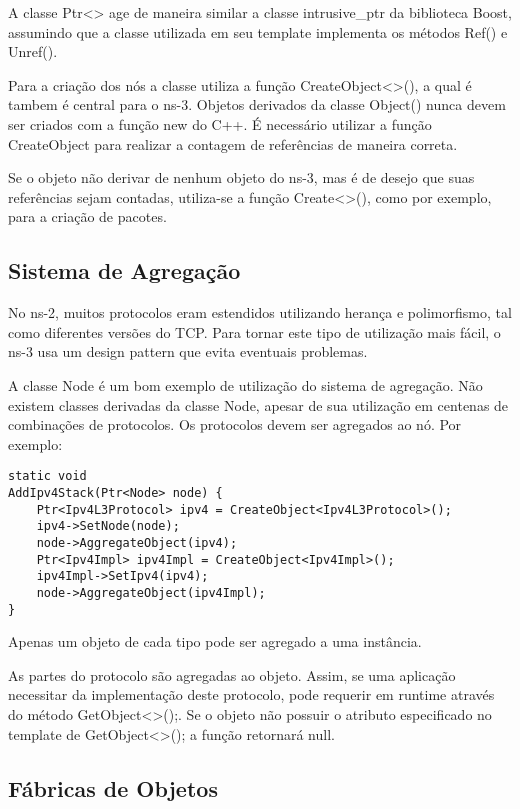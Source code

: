 \documentclass[14pt]{extarticle}
\begin{document}
A classe Ptr<> age de maneira similar a classe intrusive\_ptr da biblioteca Boost, assumindo que a classe utilizada em
seu template implementa os métodos Ref() e Unref().

Para a criação dos nós a classe utiliza a função CreateObject<>(), a qual é tambem é central para o ns-3. Objetos derivados
da classe Object() nunca devem ser criados com a função new do C++. É necessário utilizar a função CreateObject para
realizar a contagem de referências de maneira correta.

Se o objeto não derivar de nenhum objeto do ns-3, mas é de desejo que suas referências sejam contadas, utiliza-se a
função Create<>(), como por exemplo, para a criação de pacotes.

\subsection{Sistema de Agregação}

No ns-2, muitos protocolos eram estendidos utilizando herança e polimorfismo, tal como diferentes versões do TCP. Para
tornar este tipo de utilização mais fácil, o ns-3 usa um design pattern que evita eventuais problemas.

A classe Node é um bom exemplo de utilização do sistema de agregação. Não existem classes derivadas da classe Node,
apesar de sua utilização em centenas de combinações de protocolos. Os protocolos devem ser agregados ao nó. Por exemplo:

\begin{lstlisting}
static void 
AddIpv4Stack(Ptr<Node> node) {
    Ptr<Ipv4L3Protocol> ipv4 = CreateObject<Ipv4L3Protocol>();
    ipv4->SetNode(node);
    node->AggregateObject(ipv4);
    Ptr<Ipv4Impl> ipv4Impl = CreateObject<Ipv4Impl>();
    ipv4Impl->SetIpv4(ipv4);
    node->AggregateObject(ipv4Impl);
}
\end{lstlisting}

Apenas um objeto de cada tipo pode ser agregado a uma instância.

As partes do protocolo são agregadas ao objeto. Assim, se uma aplicação necessitar da implementação deste protocolo, pode
requerir em runtime através do método GetObject<>();. Se o objeto não possuir o atributo especificado no template de
GetObject<>(); a função retornará null.

\subsection{Fábricas de Objetos}
\end{document}
